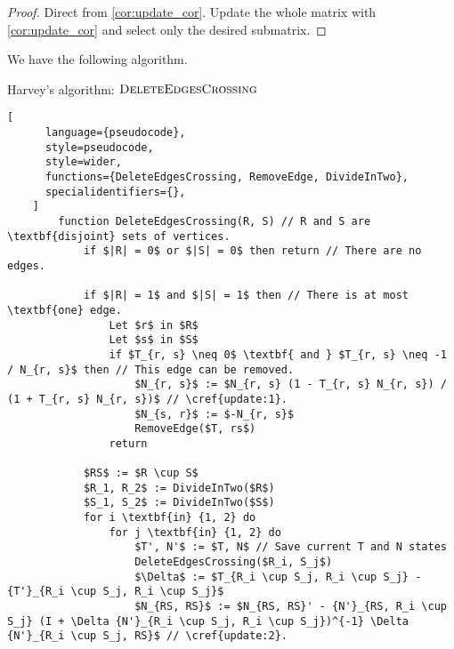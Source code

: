 \begin{proof}
    Direct from \cref{cor:update_cor}. Update the whole matrix with \ref{cor:update_cor} and select only the desired submatrix.
\end{proof}

We have the following algorithm.

\begin{programruledcaption}{Harvey's algorithm: \(\textsc{DeleteEdgesCrossing}\)}
    \begin{lstlisting}[
      language={pseudocode},
      style=pseudocode,
      style=wider,
      functions={DeleteEdgesCrossing, RemoveEdge, DivideInTwo},
      specialidentifiers={},
    ]
        function DeleteEdgesCrossing(R, S) // R and S are \textbf{disjoint} sets of vertices.
            if $|R| = 0$ or $|S| = 0$ then return // There are no edges.

            if $|R| = 1$ and $|S| = 1$ then // There is at most \textbf{one} edge.
                Let $r$ in $R$
                Let $s$ in $S$
                if $T_{r, s} \neq 0$ \textbf{ and } $T_{r, s} \neq -1 / N_{r, s}$ then // This edge can be removed.
                    $N_{r, s}$ := $N_{r, s} (1 - T_{r, s} N_{r, s}) / (1 + T_{r, s} N_{r, s})$ // \cref{update:1}.
                    $N_{s, r}$ := $-N_{r, s}$
                    RemoveEdge($T, rs$)
                return

            $RS$ := $R \cup S$
            $R_1, R_2$ := DivideInTwo($R$)
            $S_1, S_2$ := DivideInTwo($S$)
            for i \textbf{in} {1, 2} do
                for j \textbf{in} {1, 2} do
                    $T', N'$ := $T, N$ // Save current T and N states
                    DeleteEdgesCrossing($R_i, S_j$)
                    $\Delta$ := $T_{R_i \cup S_j, R_i \cup S_j} - {T'}_{R_i \cup S_j, R_i \cup S_j}$
                    $N_{RS, RS}$ := $N_{RS, RS}' - {N'}_{RS, R_i \cup S_j} (I + \Delta {N'}_{R_i \cup S_j, R_i \cup S_j})^{-1} \Delta {N'}_{R_i \cup S_j, RS}$ // \cref{update:2}.
    \end{lstlisting}
\end{programruledcaption}

